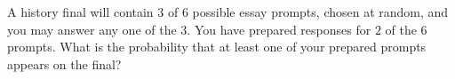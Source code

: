 A history final will contain $3$ of $6$ possible essay prompts, chosen at random, and you may answer any one of the $3$. You have prepared responses for $2$ of the $6$ prompts. What is the probability that at least one of your prepared prompts appears on the final?
